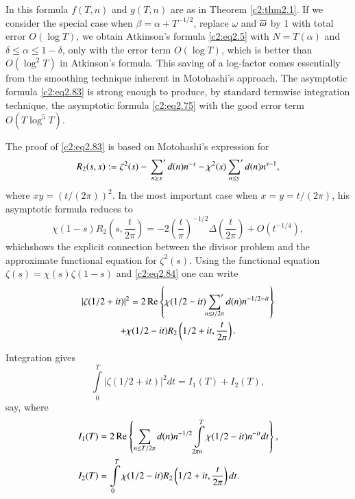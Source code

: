 In this formula $f(T, n)$ and $g(T, n)$ are as in Theorem
\ref{c2:thm2.1}. If we consider the special case when $\beta = \alpha
+ T^{-1/2}$, replace $\omega$ and $\overline{\omega}$ by 1 with total error
$O (\log T)$, we obtain Atkinson's formula \eqref{c2:eq2.5} with $N=
T(\alpha)$ and $\delta \leq \alpha \leq 1 - \delta$, only with the
error term $O(\log T)$, which is better than $O(\log^2 T)$ in
Atkinson's formula. This saving of a log-factor comes essentially from
the smoothing technique inherent in Motohashi's approach. The
asymptotic formula \eqref{c2:eq2.83} is strong enough to produce, by
standard termwise integration technique, the asymptotic formula
\eqref{c2:eq2.75} with the good error term $O(T \log^5 T)$.

The proof of \eqref{c2:eq2.83} is based on Motohashi's expression for 
\begin{equation}
R_2 (s, x): = \zeta^2 (s) - \sideset{}{'}\sum_{n \geq x} d(n) n^{-s} -
\chi^2 (s) \sideset{}{'}\sum_{n \leq y} d(n) n^{s-1},\label{c2:eq2.84}
\end{equation}
where $xy = (t/(2 \pi))^2$. In the most important case when $x= y=
t/(2 \pi)$, his asymptotic formula reduces to 
\begin{equation}
  \chi (1-s) R_2 \left(s, \frac{t}{2 \pi} \right)= - 2
  \left(\frac{t}{\pi}\right)^{-1/2} \Delta  \left(\frac{t}{2 \pi}
  \right)+ O \left(t^{-1/4} \right),\label{c2:eq2.85}
\end{equation}
which\pageoriginale shows the explicit connection between the divisor
problem and the approximate functional equation for $\zeta^2
(s)$. Using the functional equation $\zeta(s) = \chi (s) \zeta(1-s)$
and \eqref{c2:eq2.84} one can write
\begin{multline*}
|\zeta (1/2 + it)|^2 = 2 \operatorname{Re} \left\{\chi (1/2 - it) \sideset{}{'}
\sum_{n \leq t/2\pi} d(n) n^{-1/2- it}\right\} \\
+ \chi (1/2 - it) R_2 \left(1/2 + it, \frac{t}{2 \pi}\right).
\end{multline*}

Integration gives 
$$
\int\limits_0^T |\zeta (1/2 + it)|^2 dt = I_1 (T) + I_2 (T),
$$
say, where
\begin{align*}
  I_1 (T) & = 2 \operatorname{Re} \left\{\sum_{n \leq T/2 \pi} d(n) n^{-1/2}
  \int\limits_{2 \pi n}^T \chi (1/2 - it) n^{-it} dt \right\},\\
  I_2 (T) & = \int\limits_0^T \chi (1/2 - it) R_2 \left(1/2 + it,
  \frac{t}{2 \pi}\right) dt.
\end{align*}

